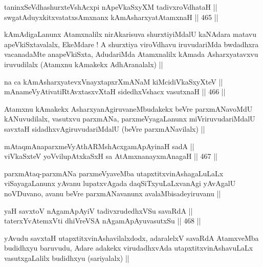 \begin{shl}
taninxSeVdhashurxteVshAcxpi nApeVkaSxyXM tadivxroVdhataH || \\
swgatAduyxkitxvatatxsAmxnanx kAmAsharxyatA\s \s tamxnaH ||  465 ||  
\end{shl}

\begin{artha}
kAmAdigaLanunx Atamxnalilx nirAkarisuva shurxtiyiMdalU kaNAdara matavu
apeVkiSxtavalalx, EkeMdare ! A shurxtiya viroVdhavu iruvudariMda
bwdadhxra vacanadaMte anapeVkiSxta, AdudariMda Atamxnalilx kAmada
Asharxyatavxvu iruvudilalx (Atamxnu kAmakekx AdhAranalalx) ||
\end{artha}

\begin{shl}
na ca kAmAsharxyatevxV\s nayxtapxrXmANaM kiMcidiVkaSxyXteV || \\
mAnameVyAtivatiRtAvxtasxvXtaH sidedhxVshacx vasutxnaH ||  466 ||  
\end{shl}

\begin{artha}
Atamxnu kAmakekx AsharxyanAgiruvaneMbudakekx beVre parxmANavoMdU
kANuvudilalx, vasutxvu parxmANa, parxmeVyagaLanunx miVriruvudariMdalU
savxtaH sidadhxvAgiruvudariMdalU (beVre parxmANavilalx) ||
\end{artha}

\begin{shl}
mAtaqmAnaparxmeVyAthARMshAcx\s \s gamApAyinaH sadA || \\
viVkaSxteV yoV\s vilupAtxkaSxH sa AtAmx\s nanayxmAnagaH ||  467 ||  
\end{shl}

\begin{artha}
parxmAtaq-parxmANa parxmeVyaveMba utapxtitxvinAshagaLuLaLx
viSayagaLanunx yAvanu lupatxvAgada daqSiTxyuLaLxvanAgi yAvAgalU
noVDuvano, avanu beVre parxmANavanunx avalaMbisadeyiruvanu ||
\end{artha}

\begin{shl}
yaH savxtoV nA\s \s gamApAyiV tadivxrudedhxVSu savaRdA || \\
taterxYvA\s \s temxVti dhiVreVSA nA\s \s gamApAyuvasutxSu ||  468 ||  
\end{shl}

\begin{artha}
yAvudu savxtaH utapxtitxvinAshavilalxdodx, adaralelxV savaRdA
AtamxveMba budidhxyu baruvudu, Adare adakekx virudadhxvAda
utapxtitxvinAshavuLaLx vasutxgaLalilx budidhxyu (sariyalalx) ||
\end{artha} 

